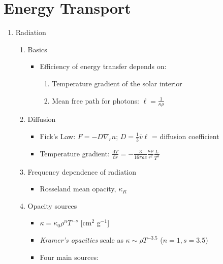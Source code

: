 \documentclass{article}
\begin{document}
\newpage
\section{Energy Transport}
\begin{enumerate}
    \item Radiation
        \begin{enumerate}
            \item Basics
                \begin{itemize}
                    \item Efficiency of energy transfer depends on:
                        \begin{enumerate}[label=\arabic{*}.]
                            \item Temperature gradient of the solar interior
                            \item Mean free path for photons: $\ell = \frac{1}{\kappa\rho}$
                        \end{enumerate}
                \end{itemize}
            \item Diffusion
                \begin{itemize}
                    \item Fick's Law: $ F = -D \nabla_{r} n $;
                        $ D = \frac{1}{3}\overline{v}\ell $
                        = diffusion coefficient
                    \item Temperature gradient: $ \frac{\mathrm{d}T}{\mathrm{d}r} = -\frac{3}{16\pi ac} \frac{\kappa\rho}{r^{2}}\frac{L}{T^{3}} $
                \end{itemize}
            \item Frequency dependence of radiation
                \begin{itemize}
                    \item Rosseland mean opacity, $\kappa_{R}$
                \end{itemize}
            \item Opacity sources
                \begin{itemize}
                    \item $\kappa = \kappa_{0} \rho^{n} T^{-s}$ [cm$^{2}$ g$^{-1}$]
                    \item \textit{Kramer's opacities} scale as $ \kappa \sim \rho T^{-3.5} $
                        ($n = 1, s = 3.5$)
                    \item Four main sources:

\end{itemize}
\end{enumerate}
\end{enumerate}
\end{document}
